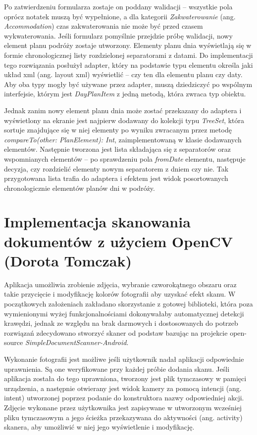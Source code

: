 \documentclass[10pt,twoside,a4paper]{report}
\begin{document}
\par Po zatwierdzeniu formularza zostaje on poddany walidacji – wszystkie pola oprócz notatek muszą być wypełnione, a dla kategorii \textit{Zakwaterowanie} (ang. \textit{Accommodation}) czas zakwaterowania nie może być przed czasem wykwaterowania. Jeśli formularz pomyślnie przejdzie próbę walidacji, nowy element planu podróży zostaje utworzony.
Elementy planu dnia wyświetlają się w formie chronologicznej listy rozdzielonej separatorami z datami. Do implementacji tego rozwiązania posłużył adapter, który na podstawie typu elementu określa jaki układ xml (ang. layout xml) wyświetlić – czy ten dla elementu planu czy daty. Aby oba typy mogły być używane przez adapter, muszą dziedziczyć po wspólnym interfejsie, którym jest \textit{DayPlanItem} z jedną metodą, która zwraca typ obiektu.
\par Jednak zanim nowy element planu dnia może zostać przekazany do adaptera i wyświetlony na ekranie jest najpierw dodawany do kolekcji typu \textit{TreeSet}, która sortuje znajdujące się w niej elementy po wyniku zwracanym przez metodę \textit{compareTo(other: PlanElement): Int}, zaimplementowaną w klasie dodawanych elementów. Następnie tworzona jest lista składająca się z separatorów oraz wspomnianych elementów – po sprawdzeniu pola \textit{fromDate} elementu, następuje decyzja, czy rozdzielić elementy nowym separatorem z dniem czy nie. Tak przygotowana lista trafia do adaptera i efektem jest widok posortowanych chronologicznie elementów planów dni w podróży.


\section{Implementacja skanowania dokumentów z użyciem OpenCV (Dorota Tomczak)}
\par Aplikacja umożliwia zrobienie zdjęcia, wybranie czworokątnego obszaru oraz takie przycięcie i modyfikację kolorów fotografii aby uzyskać efekt skanu. W początkowych założeniach zakładano skorzystanie z gotowej biblioteki, która poza wymienionymi wyżej funkcjonalnościami dokonywałaby automatycznej detekcji krawędzi, jednak ze względu na brak darmowych i dostosowanych do potrzeb rozwiązań zdecydowano stworzyć skaner od podstaw bazując na projekcie open-source \textit{SimpleDocumentScanner-Android}\cite{SimpleDocumentScanner-Android}.

\par Wykonanie fotografii jest możliwe jeśli użytkownik nadał aplikacji odpowiednie uprawnienia. Są one weryfikowane przy każdej próbie dodania skanu. Jeśli aplikacja została do tego uprawniona, tworzony jest plik tymczasowy w pamięci urządzenia, a następnie otwierany jest widok kamery za pomocą intencji (ang. intent) utworzonej poprzez podanie do konstruktora nazwy odpowiedniej akcji. Zdjęcie wykonane przez użytkownika jest zapisywane w utworzonym wcześniej pliku tymczasowym a jego ścieżka przekazywana do aktywności (ang. activity) skanera, aby umożliwić w niej jego wyświetlenie i modyfikację.
\end{document}
